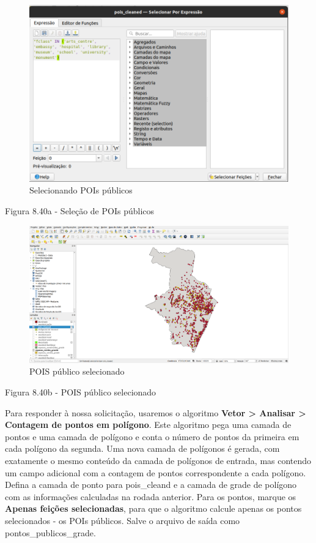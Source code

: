 \documentclass[
  portuguese,
]{krantz}
\begin{document}
\begin{figure}
\centering
\includegraphics{media/modulo8/fig840_a.png}
\caption{Selecionando POIs públicos}
\end{figure}

Figura 8.40a - Seleção de POIs públicos

\begin{figure}
\centering
\includegraphics{media/modulo8/fig840_b.png}
\caption{POIS público selecionado}
\end{figure}

Figura 8.40b - POIS público selecionado

Para responder à nossa solicitação, usaremos o algoritmo \textbf{Vetor \textgreater{} Analisar \textgreater{} Contagem de pontos em polígono}. Este algoritmo pega uma camada de pontos e uma camada de polígono e conta o número de pontos da primeira em cada polígono da segunda. Uma nova camada de polígonos é gerada, com exatamente o mesmo conteúdo da camada de polígonos de entrada, mas contendo um campo adicional com a contagem de pontos correspondente a cada polígono. Defina a camada de ponto para pois\_cleand e a camada de grade de polígono com as informações calculadas na rodada anterior. Para os pontos, marque os \textbf{Apenas feições selecionadas}, para que o algoritmo calcule apenas os pontos selecionados - os POIs públicos. Salve o arquivo de saída como pontos\_publicos\_grade.
\end{document}
